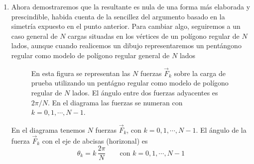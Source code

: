 \documentclass[a4paper,10pt]{article}
\begin{document}
\begin{soluc}
\begin{enumerate}
\item Ahora demostraremos que la resultante es nula de una forma más elaborada
  y prescindible, habida cuenta de la sencillez del argumento basado en la
  simetría expuesto en el punto anterior. Para cambiar algo, seguiremos
  a un caso general de $N$ cargas situadas en los vértices de un polígono
  regular de $N$ lados, aunque cuando realicemos un dibujo representaremos
  un pentángono regular como modelo de polígono regular general de $N$ lados
  
\begin{figure}[ht]
    \def\scl{1}
    \def\lado{2}
    \def\qsize{7.5pt}
    \def\Qsize{6.5pt}
    \centering
\begin{minipage}{0.5\linewidth}
    \caption{En esta figura se representan las $N$ fuerzas $\vec{F}_{k}$ sobre la
    carga de prueba utilizando un pentágno regular como modelo de polígono
    regular de $N$ lados. El ángulo entre dos fuerzas adyacentes es $2\pi/N$.
  En el diagrama las fuerzas se numeran con $k=0,1,\cdots,N-1$.}
  \label{fig:cargas_en_poligono_regular}
  \end{minipage}
\end{figure}

En el diagrama tenemos $N$ fuerzas $\vec{F}_{k}$, con $k=0,1,\cdots,N-1$.
El ángulo de la fuerza $\vec{F}_{k}$ con el eje de abcisas (horizonal) es
\[
  \theta_{k} = k\,\frac{2\pi}{N}
  \hspace{2em}\text{con }
  k = 0,1,\cdots, N-1
\]


\end{enumerate}
\end{soluc}
\end{document}
